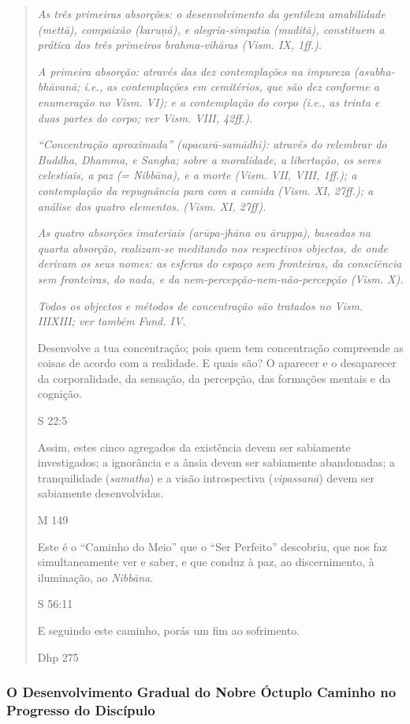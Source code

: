 \begin{quote}
\emph{As três primeiras absorções: o desenvolvimento da gentileza amabilidade (mettā), compaixão (karuṇā), e alegria-simpatia (muditā), constituem a prática dos três primeiros brahma-vihāras (Vism. IX, 1ff.).}

\emph{A primeira absorção: através das dez contemplações na impureza (asubha-bhāvanā; i.e., as contemplações em cemitérios, que são dez conforme a enumeração no Vism. VI); e a contemplação do corpo (i.e., as trinta e duas partes do corpo; ver Vism. VIII, 42ff.).}

\emph{``Concentração aproximada'' (upacarā-samādhi): através do relembrar do Buddha, Dhamma, e Sangha; sobre a moralidade, a libertação, os seres celestiais, a paz (= Nibbāna), e a morte (Vism. VII, VIII, 1ff.); a contemplação da repugnância para com a comida (Vism. XI, 27ff.); a análise dos quatro elementos. (Vism. XI, 27ff).}

\emph{As quatro absorções imateriais (arūpa-jhāna ou āruppa), baseadas na quarta absorção, realizam-se meditando nos respectivos objectos, de onde derivam os seus nomes: as esferas do espaço sem fronteiras, da consciência sem fronteiras, do nada, e da nem-percepção-nem-não-percepção (Vism. X).}

\emph{Todos os objectos e métodos de concentração são tratados no Vism. IIIXIII; ver também Fund. IV.}

Desenvolve a tua concentração; pois quem tem concentração compreende as coisas de acordo com a realidade. E quais são? O aparecer e o desaparecer da corporalidade, da sensação, da percepção, das formações mentais e da cognição.

S 22:5

Assim, estes cinco agregados da existência devem ser sabiamente investigados; a ignorância e a ânsia devem ser sabiamente abandonadas; a tranquilidade (\emph{samatha}) e a visão introspectiva (\emph{vipassanā}) devem ser sabiamente desenvolvidas.

M 149

Este é o ``Caminho do Meio'' que o ``Ser Perfeito'' descobriu, que nos faz simultaneamente ver e saber, e que conduz à paz, ao discernimento, à iluminação, ao \emph{Nibbāna}.

S 56:11

E seguindo este caminho, porás um fim ao sofrimento.

Dhp 275
\end{quote}

\subsubsection{O Desenvolvimento Gradual do Nobre Óctuplo Caminho no Progresso do Discípulo}\label{o-desenvolvimento-gradual-do-nobre-uxf3ctuplo-caminho-no-progresso-do-discuxedpulo}

